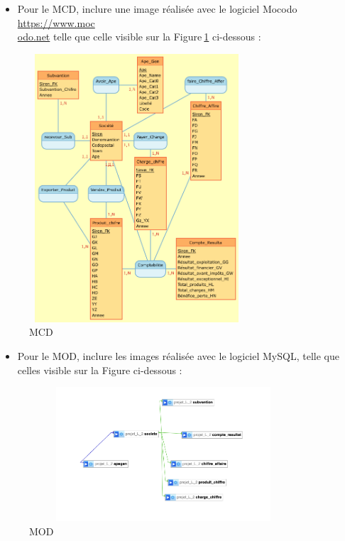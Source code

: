 \documentclass[mstat,12pt]{unswthesis}
\begin{document}
\begin{itemize}
\tightlist
\item
  Pour le MCD, inclure une image réalisée avec le logiciel Mocodo
  \href{https://www.mocodo.net/?mcd=eNqNksFu2zAMhu96Ch0dQAOW7Zab67ZK2zTL4ixtcjEUh14FOJKhyFm3N_J9b-AX62_HaOMEAwb4Ay1SIvlLjMvNQRmvrRnxWDsywe3DQPD43R296MwRCw9Wu7AgMRzy2Ka6rnxdieGUwyfJsKMZNUsBpmrX2kj5z50ddvZLZ7-Kid5QniNNZLfEMoXyTTWUC7OM3EWpLpggiq2j0BgixhyldLClQ8uC945wnPkQ0u1_D49auYJfk7E7fdwjeNNKYfde5WJhf8GBZtlM_SYXvSj380w_b7tq_Ena3lNX5KzT05u9DcE1kOAePIIp-AZm4DuYM3bzWljnyc2c3ZbaX9btAv3CSzJbR01Il_97pi-g12sMFuAHWIIn8AxWYC24_PNp9cxGDN9Z5pMsEiLlA5gAiJUQKyFWQuwYlzG-AhHApaxvBF8h-WrNIrsrvNroXHtqH79Z05z2Ze5VTxm_nA1xoVX866VO0_bEz-uqdfqEXovcavxhQgIpe7FMG2VSTS6Qy4H48Ktm6hK9K-q_fh_Ip7OEKRVNNkN5ML5DbGExcUlxbHkfjCcDcXSlbc_wPGLXVV2Zusp0SklBGI5gPB2wN-SeTJ4=}{https://www.moc\\odo.net}
  telle que celle visible sur la Figure\(~\)\ref{MCD} ci-dessous :
\end{itemize}

\begin{figure}
\centering
\includegraphics[width=8cm,height=10cm]{image_sql/MCD.png}
\caption{MCD}\label{MCD}
\end{figure}

\begin{itemize}
\tightlist
\item
  Pour le MOD, inclure les images réalisée avec le logiciel MySQL, telle
  que celles visible sur la Figure ci-dessous :
\end{itemize}

\begin{figure}
\centering
\includegraphics[width=10cm,height=5cm]{image_sql/mssql_1.png}
\caption{MOD}\label{M0D}
\end{figure}
\end{document}
